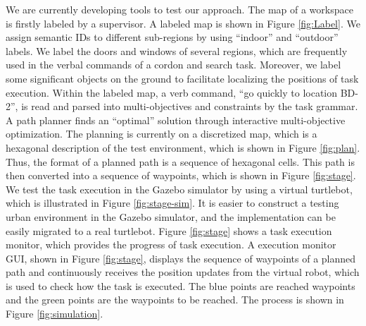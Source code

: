We are currently developing tools to test our approach.
The map of a workspace is firstly labeled by a supervisor.
A labeled map is shown in Figure \ref{fig:Label}.
We assign semantic IDs to different sub-regions by using ``indoor'' and ``outdoor'' labels.
We label the doors and windows of several regions, which are frequently used in the verbal commands of a cordon and search task.
Moreover, we label some significant objects on the ground to facilitate localizing the positions of task execution.
Within the labeled map, a verb command, ``go quickly to location BD-2'', is read and parsed into multi-objectives and constraints by the task grammar.
A path planner finds an ``optimal'' solution through interactive multi-objective optimization.
The planning is currently on a discretized map, which is a hexagonal description of the test environment, which is shown in Figure \ref{fig:plan}.
Thus, the format of a planned path is a sequence of hexagonal cells.
This path is then converted into a sequence of waypoints, which is shown in Figure \ref{fig:stage}.
We test the task execution in the Gazebo simulator by using a virtual turtlebot, which is illustrated in Figure \ref{fig:stage-sim}.
It is easier to construct a testing urban environment in the Gazebo simulator, and the implementation can be easily migrated to a real turtlebot.
Figure \ref{fig:stage} shows a task execution monitor, which provides the progress of task execution.
A execution monitor GUI, shown in Figure \ref{fig:stage}, displays the sequence of waypoints of a planned path and continuously receives the position updates from the virtual robot, which is used to check how the task is executed.
The blue points are reached waypoints and the green points are the waypoints to be reached.
The process is shown in Figure \ref{fig:simulation}.
